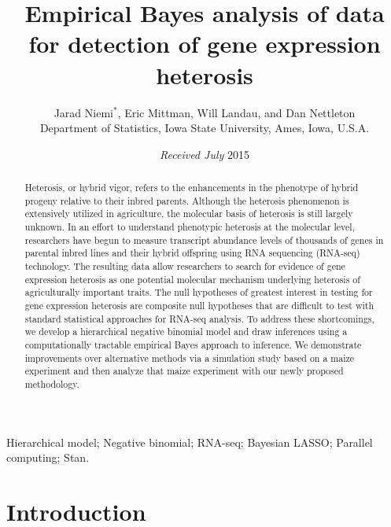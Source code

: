 \documentclass[useAMS,usenatbib,referee]{biom}
\title{Empirical Bayes analysis of \RNAseq{} data for detection of gene expression heterosis}
\author{Jarad Niemi$^*$\email{niemi@iastate.edu}, 
Eric Mittman, 
Will Landau, and 
Dan Nettleton \\
Department of Statistics, Iowa State University, Ames, Iowa, U.S.A.}
\newcommand{\Stan}{Stan}
\newcommand{\RNAseq}{RNA-seq}
\begin{document}
\date{{\it Received July} 2015} 

\pagerange{\pageref{firstpage}--\pageref{lastpage}} 

\label{firstpage}

\begin{abstract}
Heterosis, or hybrid vigor, refers to the enhancements in the phenotype of hybrid progeny relative to their inbred parents. Although the heterosis phenomenon is extensively utilized in agriculture, the molecular basis of heterosis is still largely unknown. In an effort to understand phenotypic heterosis at the molecular level, researchers have begun to measure transcript abundance levels of thousands of genes in parental inbred lines and their hybrid offspring using RNA sequencing (\RNAseq{}) technology.  The resulting data allow researchers to search for evidence of gene expression heterosis as one potential molecular mechanism underlying heterosis of agriculturally important traits.  The null hypotheses of greatest interest in testing for gene expression heterosis are composite null hypotheses that are difficult to test with standard statistical approaches for \RNAseq{} analysis. To address these shortcomings, we develop a hierarchical negative binomial model and draw inferences using a computationally tractable empirical Bayes approach to inference. We demonstrate improvements over alternative methods via a simulation study based on a maize experiment and then analyze that maize experiment with our newly proposed methodology. 
\end{abstract}

\begin{keywords}
Hierarchical model; Negative binomial; \RNAseq{}; Bayesian LASSO; Parallel computing; \Stan{}.
\end{keywords}

\maketitle


\section{Introduction}
\label{s:intro}
\end{document}
